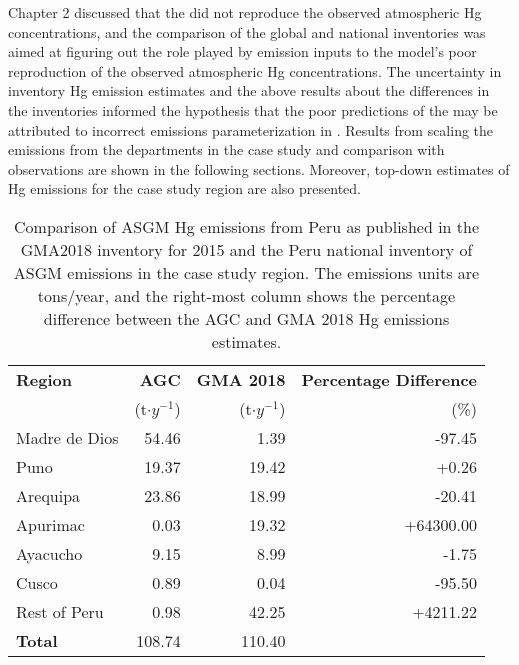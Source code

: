 \begin{flushleft}
    Chapter 2 discussed that the \on did not reproduce the observed atmospheric Hg concentrations, and the comparison of the  global and national inventories was aimed at figuring out the role played by emission inputs to the model's poor reproduction of the observed atmospheric Hg concentrations. The uncertainty in inventory Hg emission estimates and the above results about the differences in the inventories informed the hypothesis that the poor predictions of the \on may be attributed to incorrect emissions parameterization in \gc. Results from scaling the emissions from the departments in the case study and comparison with observations are shown in the following sections. Moreover, top-down estimates of Hg emissions for the case study region are also presented.
\end{flushleft}
\setlength{\tabcolsep}{5pt}
\begin{table}[H]
  \begin{center}
    \caption{Comparison of ASGM Hg emissions from Peru as published in the GMA2018 inventory for 2015 and the Peru national inventory of ASGM emissions in the case study region. The emissions units are tons/year, and the right-most column shows the percentage difference between the AGC and GMA 2018 Hg emissions estimates. }
    \label{tab:agc_vs_gma18}
    \begin{tabular}{lrrr}
      
    \textbf{Region}     & \textbf{AGC}      & \textbf{GMA 2018}             & \textbf{Percentage Difference}       \\
                        & (t$\cdot y^{-1}$) & (t$\cdot y^{-1}$)                    &        (\%)\\
\hline    
    Madre de Dios       & 54.46             & 1.39                          &    -97.45       \\
    Puno                & 19.37             & 19.42                         &    +0.26     \\
    Arequipa            & 23.86             & 18.99                         &    -20.41       \\ %
    Apurimac            & 0.03              & 19.32                         &    +64300.00    \\
    Ayacucho            & 9.15              & 8.99                          &    -1.75           \\ %
    Cusco               & 0.89              & 0.04                          &    -95.50           \\
    Rest of Peru        &  0.98             & 42.25                         &    +4211.22        \\
   
    \hline
    \textbf{Total}           &108.74           & 110.40      &        \\
    \end{tabular}
  \end{center}
\end{table}

